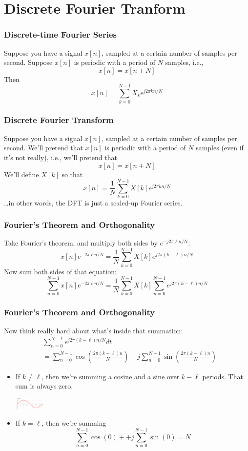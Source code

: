 \documentclass{beamer}
\begin{document}
\section[DFT]{Discrete Fourier Tranform}
\setcounter{subsection}{1}

\begin{frame}
  \frametitle{Discrete-time Fourier Series}

  Suppose you have a signal $x[n]$, sampled at a certain number of samples per second.
  Suppose $x[n]$ is periodic with a period of $N$ samples, i.e.,
  \[
  x[n] = x[n+N]
  \]
  Then
  \[
  x[n] = \sum_{k=0}^{N-1} X_k e^{j2\pi kn/N}
  \]
\end{frame}

\begin{frame}
  \frametitle{Discrete Fourier Transform}

  Suppose you have a signal $x[n]$, sampled at a certain number of
  samples per second.  We'll pretend that $x[n]$ is periodic with a
  period of $N$ samples (even if it's not really), i.e., we'll pretend
  that
  \[
  x[n] = x[n+N]
  \]
  We'll define $X[k]$ so that
  \[
  x[n] = \frac{1}{N}\sum_{k=0}^{N-1} X[k] e^{j2\pi kn/N}
  \]
  \ldots in other words, the DFT is just a scaled-up  Fourier series.
\end{frame}

\begin{frame}
  \frametitle{Fourier's Theorem and Orthogonality}

  Take Fourier's theorem, and multiply both sides by $e^{-j2\pi \ell n/N}$:
  \[
  x[n]e^{-2\pi\ell n/N} = \frac{1}{N}\sum_{k=0}^{N-1} X[k] e^{j2\pi (k-\ell)n/N}
  \]
  Now sum both sides of that equation:
  \[
  \sum_{n=0}^{N-1}x[n]e^{-2\pi\ell n/N} =
  \frac{1}{N}\sum_{k=0}^{N-1} X[k] \sum_{n=0}^{N-1} e^{j2\pi (k-\ell)n/N}
  \]
\end{frame}

\begin{frame}
  \frametitle{Fourier's Theorem and Orthogonality}

  Now think really hard about what's inside that summation:
  \begin{align*}
    &\sum_{n=0}^{N-1} e^{j2\pi (k-\ell)n/N}dt\\
    &=\sum_{n=0}^{N-1}\cos\left(\frac{2\pi(k-\ell)n}{N}\right)
    +j\sum_{n=0}^{N-1}\sin\left(\frac{2\pi (k-\ell)n}{N}\right)
  \end{align*}
  \begin{itemize}
  \item If $k\ne\ell$, then we're summing a cosine and a sine over
    $k-\ell$ periods.  That sum is always zero.
    \centerline{\includegraphics[height=0.25in]{Sine_one_period.png}}
  \item If $k=\ell$, then we're summing
    \[
    \sum_{n=0}^{N-1}\cos(0)+
    +j\sum_{n=0}^{N-1}\sin(0) = N
    \]
  \end{itemize}
\end{frame}
\end{document}
